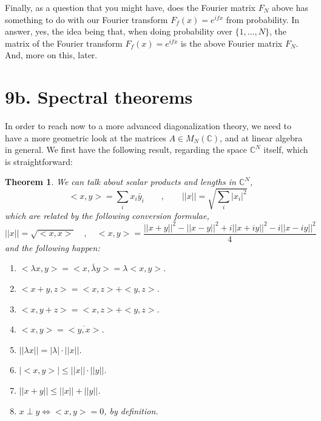 \documentclass[12pt]{amsbook}
\newtheorem{theorem}{Theorem}[chapter]
\begin{document}
Finally, as a question that you might have, does the Fourier matrix $F_N$ above has something to do with our Fourier transform $F_f(x)=e^{ifx}$ from probability. In answer, yes, the idea being that, when doing probability over $\{1,\ldots,N\}$, the matrix of the Fourier transform $F_f(x)=e^{ifx}$ is the above Fourier matrix $F_N$. And, more on this, later.

\section*{9b. Spectral theorems}

In order to reach now to a more advanced diagonalization theory, we need to have a more geometric look at the matrices $A\in M_N(\mathbb C)$, and at linear algebra in general. We first have the following result, regarding the space $\mathbb C^N$ itself, which is straightforward: 

\begin{theorem}
We can talk about scalar products and lengths in $\mathbb C^N$,
$$<x,y>=\sum_ix_i\bar{y}_i\qquad,\qquad ||x||=\sqrt{\sum_i|x_i|^2}$$
which are related by the following conversion formulae,
$$||x||=\sqrt{<x,x>}\quad,\quad <x,y>
=\frac{||x+y||^2-||x-y||^2+i||x+iy||^2-i||x-iy||^2}{4}$$
and the following happen:
\begin{enumerate}
\item $<\lambda x,y>=<x,\bar{\lambda}y>=\lambda<x,y>$.

\item $<x+y,z>=<x,z>+<y,z>$.

\item $<x,y+z>=<x,z>+<y,z>$. 

\item $<x,y>=\overline{<y,x>}$.

\item $||\lambda x||=|\lambda|\cdot||x||$.

\item $|<x,y>|\leq||x||\cdot||y||$.

\item $||x+y||\leq||x||+||y||$.

\item $x\perp y\iff<x,y>=0$, by definition.
\end{enumerate}
\end{theorem}
\end{document}

